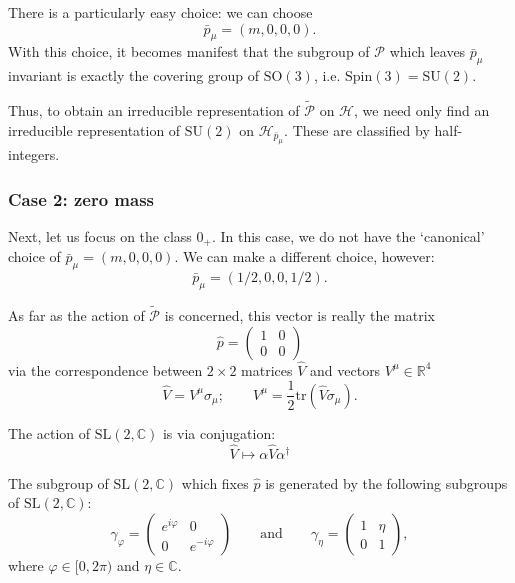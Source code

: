 \documentclass[a4paper,10pt]{scrreprt}
\newcommand{\R}{\mathbb{R}}
\newcommand{\C}{\mathbb{C}}
\newcommand{\SO}{\mathrm{SO}}
\newcommand{\SL}{\mathrm{SL}}
\newcommand{\SU}{\mathrm{SU}}
\theoremstyle{definition}
\theoremstyle{plain}
\theoremstyle{remark}
\begin{document}
There is a particularly easy choice: we can choose 
\begin{equation*}
  \bar{p}_{\mu} = (m,0,0,0).
\end{equation*}
With this choice, it becomes manifest that the subgroup of $\mathcal{P}$ which leaves $\bar{p}_{\mu}$ invariant is exactly the covering group of $\SO(3)$, i.e. $\mathrm{Spin}(3) = \SU(2)$.

Thus, to obtain an irreducible representation of $\widetilde{\mathcal{P}}$ on $\mathscr{H}$, we need only find an irreducible representation of $\SU(2)$ on $\mathscr{H}_{\bar{p}_{\mu}}$. These are classified by half-integers.

\subsubsection{Case 2: zero mass}
Next, let us focus on the class $0_{+}$. In this case, we do not have the `canonical' choice of $\bar{p}_{\mu} = (m,0,0,0)$. We can make a different choice, however:
\begin{equation*}
  \bar{p}_{\mu} = (1/2,0,0,1/2).
\end{equation*}

As far as the action of $\widetilde{\mathcal{P}}$ is concerned, this vector is really the matrix
\begin{equation*}
  \hat{p} = 
  \begin{pmatrix}
    1 & 0 \\
    0 & 0
  \end{pmatrix}
\end{equation*}
via the correspondence between $2 \times 2$ matrices $\hat{V}$ and vectors $V^{\mu} \in \R^{4}$
\begin{equation*}
  \hat{V} = V^{\mu}\sigma_{\mu};\qquad V^{\mu} = \frac{1}{2} \mathrm{tr}(\hat{V} \sigma_{\mu}).
\end{equation*}

The action of $\SL(2, \C)$ is via conjugation:
\begin{equation*}
  \hat{V} \mapsto \alpha \hat{V} \alpha^{\dagger}
\end{equation*}

The subgroup of $\SL(2, \C)$ which fixes $\hat{p}$ is generated by the following subgroups of $\SL(2, \C)$:
\begin{equation*}
  \gamma_{\varphi} = 
  \begin{pmatrix}
    e^{i \varphi} & 0 \\
    0 & e^{-i \varphi}
  \end{pmatrix}
  \qquad\text{and}\qquad \gamma_{\eta} = 
  \begin{pmatrix}
    1 & \eta \\
    0 & 1
  \end{pmatrix},
\end{equation*}
where $\varphi \in [0, 2\pi)$ and $\eta \in \C$.
\end{document}
